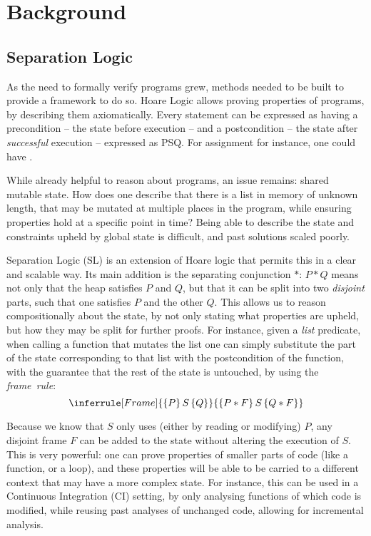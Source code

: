 \chapter{Background}

\section{Separation Logic}

As the need to formally verify programs grew, methods needed to be built to provide a framework to do so. Hoare Logic \cite{hoarelogic} allows proving properties of programs, by describing them axiomatically. Every statement can be expressed as having a precondition -- the state before execution -- and a postcondition -- the state after \emph{successful} execution -- expressed as \SLtriple PSQ. For assignment for instance, one could have .

While already helpful to reason about programs, an issue remains: shared mutable state. How does one describe that there is a list in memory of unknown length, that may be mutated at multiple places in the program, while ensuring properties hold at a specific point in time? Being able to describe the state and constraints upheld by global state is difficult, and past solutions scaled poorly.

Separation Logic (SL) \cite{seplogic1, seplogic2} is an extension of Hoare logic that permits this in a clear and scalable way. Its main addition is the separating conjunction $*$: $P * Q$ means not only that the heap satisfies $P$ and $Q$, but that it can be split into two \emph{disjoint} parts, such that one satisfies $P$ and the other $Q$. This allows us to reason compositionally about the state, by not only stating what properties are upheld, but how they may be split for further proofs. For instance, given a \emph{list} predicate, when calling a function that mutates the list one can simply substitute the part of the state corresponding to that list with the postcondition of the function, with the guarantee that the rest of the state is untouched, by using the \emph{frame~rule}:
\[
\inferrule[Frame]
	{\SLtriple{P}{S}{Q}}
	{\SLtriple{P*F}{S}{Q*F}}
\]

Because we know that $S$ only uses (either by reading or modifying) $P$, any disjoint frame $F$ can be added to the state without altering the execution of $S$. This is very powerful: one can prove properties of smaller parts of code (like a function, or a loop), and these properties will be able to be carried to a different context that may have a more complex state. For instance, this can be used in a Continuous Integration (CI) setting, by only analysing functions of which code is modified, while reusing past analyses of unchanged code, allowing for incremental analysis.

